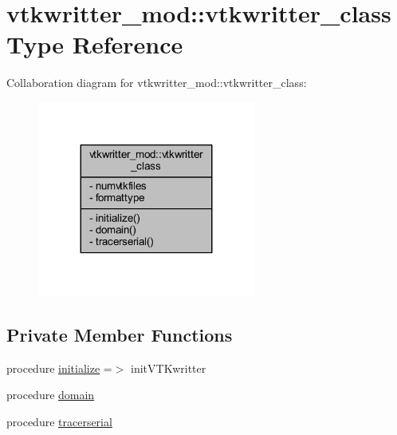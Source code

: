 \hypertarget{structvtkwritter__mod_1_1vtkwritter__class}{}\section{vtkwritter\+\_\+mod\+:\+:vtkwritter\+\_\+class Type Reference}
\label{structvtkwritter__mod_1_1vtkwritter__class}


Collaboration diagram for vtkwritter\+\_\+mod\+:\+:vtkwritter\+\_\+class\+:\nopagebreak
\begin{figure}[H]
\begin{center}
\leavevmode
\includegraphics[width=203pt]{structvtkwritter__mod_1_1vtkwritter__class__coll__graph}
\end{center}
\end{figure}
\subsection*{Private Member Functions}
\begin{DoxyCompactItemize}
\item 
procedure \mbox{\hyperlink{structvtkwritter__mod_1_1vtkwritter__class_ad74a863969884dacf4c8d9b96088c6a6}{initialize}} =$>$ init\+V\+T\+Kwritter
\item 
procedure \mbox{\hyperlink{structvtkwritter__mod_1_1vtkwritter__class_a7abd7831d763c178e15bd8b6fb7e358e}{domain}}
\item 
procedure \mbox{\hyperlink{structvtkwritter__mod_1_1vtkwritter__class_ad87da7194456a9b70f60f53f19a5c47b}{tracerserial}}
\end{DoxyCompactItemize}
